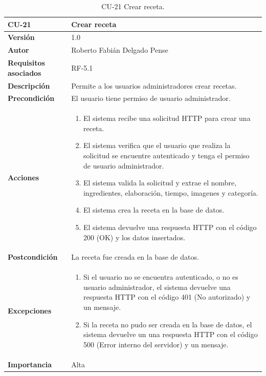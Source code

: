 \begin{table}[p]
	\centering
	\begin{tabularx}{\linewidth}{ p{} p{} }
		\toprule
		\textbf{CU-21}    & \textbf{Crear receta}\\
		\toprule
		\textbf{Versión}              & 1.0    \\
		\textbf{Autor}                & Roberto Fabián Delgado Pense \\
		\textbf{Requisitos asociados} & RF-5.1 \\ 
		\textbf{Descripción}          & Permite a los usuarios administradores crear recetas. \\
		\textbf{Precondición}         & El usuario tiene permiso de usuario administrador. \\  
		\textbf{Acciones}             &
		\begin{enumerate}
			\def\labelenumi{\arabic{enumi}.}
			\tightlist
			\item El sistema recibe una solicitud HTTP para crear una receta.
                \item El sistema verifica que el usuario que realiza la solicitud se encuentre autenticado y tenga el permiso de usuario administrador.
                \item El sistema valida la solicitud y extrae el nombre, ingredientes, elaboración, tiempo,     imagenes y categoría.
                \item El sistema crea la receta en la base de datos.
                \item El sistema devuelve una respuesta HTTP con el código 200 (OK) y los datos insertados.         
            \end{enumerate}\\
		\textbf{Postcondición}        & La receta fue creada en la base de datos. \\
		\textbf{Excepciones}          & 
              \begin{enumerate}
			\def\labelenumi{\arabic{enumi}.}
			\tightlist
   			\item Si el usuario no se encuentra autenticado, o no es usuario administrador, el sistema devuelve una                 respuesta HTTP con el código 401 (No autorizado) y un mensaje.
                \item   Si la receta no pudo ser creada en la base de datos, el sistema devuelve un                           una respuesta HTTP con el código 500 (Error interno del servidor) y un mensaje. 
            \end{enumerate}\\
		\textbf{Importancia}          & Alta \\
		\bottomrule
	\end{tabularx}
	\caption{CU-21 Crear receta.}
\end{table}

